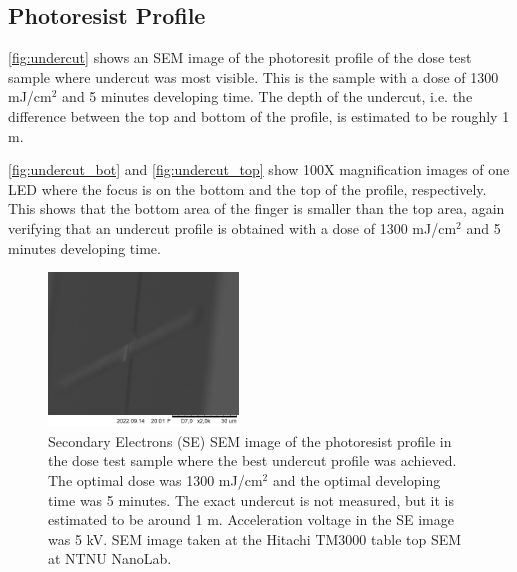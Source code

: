 
\subsection{Photoresist Profile}

\autoref{fig:undercut} shows an SEM image of the photoresit profile of the dose test sample where undercut was most visible.
This is the sample with a dose of 1300 mJ/cm$^2$ and 5 minutes developing time.
The depth of the undercut, i.e. the difference between the top and bottom of the profile, is estimated to be roughly 1 \textmu m.

\autoref{fig:undercut_bot} and \autoref{fig:undercut_top} show 100X magnification images of one LED where the focus is on the bottom and the top of the profile, respectively.
This shows that the bottom area of the finger is smaller than the top area, again verifying that an undercut profile is obtained with a dose of 1300 mJ/cm$^2$ and 5 minutes developing time.

\begin{figure}[ht]
    \centering
    \includegraphics[width=0.45\textwidth]{figures/Undercut_5min_1200mJcm-2.jpg}
    \caption{
        Secondary Electrons (SE) SEM image of the photoresist profile in the dose test sample where the best undercut profile was achieved.
        The optimal dose was 1300 mJ/cm$^2$ and the optimal developing time was 5 minutes.
        The exact undercut is not measured, but it is estimated to be around 1 \textmu m.
        Acceleration voltage in the SE image was 5 kV.
        SEM image taken at the Hitachi TM3000 table top SEM at NTNU NanoLab.
    }
    \label{fig:undercut}
\end{figure}

